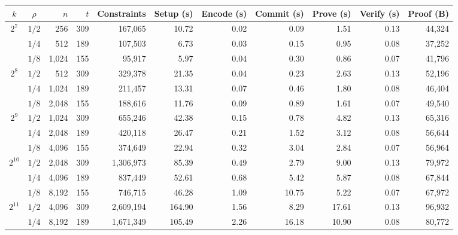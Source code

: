 \documentclass[conference,compsoc]{IEEEtran}
\newif\ifshowrevisions
\newenvironment{revblock}[1][]
  {%
    \ifshowrevisions
      \begin{tcolorbox}[
        breakable,
        colback=revisionyellow,
        colframe=revisionyellow,
        boxrule=0pt,
        arc=0pt,
        left=2pt,
        right=2pt,
        top=2pt,
        bottom=2pt,
        before skip=2pt,
        after skip=2pt,
        #1
      ]
    \fi
  }
  {%
    \ifshowrevisions
      \end{tcolorbox}
    \fi
  }
\theoremstyle{plain}
\theoremstyle{definition}
\theoremstyle{remark}
\providecommand{\DIFaddend}{} %
\begin{document}
\DIFaddend %
\begin{table}[!t]
\centering
\scriptsize
\setlength{\tabcolsep}{4pt}
\begin{revblock}[unbreakable]
\begin{tabular*}{\linewidth}{@{\extracolsep{\fill}}ccrrrrrrrrr@{}}
\toprule
\textbf{\(k\)} & \textbf{\(\rho\)} & \textbf{\(n\)} & \textbf{\(t\)}
& \textbf{Constraints} & \textbf{Setup (s)} & \textbf{Encode (s)}
& \textbf{Commit (s)} & \textbf{Prove (s)}
& \textbf{Verify (s)} & \textbf{Proof (B)} \\
\midrule
\multirow{3}{*}{\(2^7\)}
& \(1/2\) & 256 & 309 & 167{,}065 & 10.72 & 0.02 & 0.09 & 1.51 & 0.13 & 44{,}324 \\
& \(1/4\) & 512 & 189 & 107{,}503 & 6.73 & 0.03 & 0.15 & 0.95 & 0.08 & 37{,}252 \\
& \(1/8\) & 1{,}024 & 155 & 95{,}917 & 5.97 & 0.04 & 0.30 & 0.86 & 0.07 & 41{,}796 \\
\midrule
\multirow{3}{*}{\(2^8\)}
& \(1/2\) & 512 & 309 & 329{,}378 & 21.35 & 0.04 & 0.23 & 2.63 & 0.13 & 52{,}196 \\
& \(1/4\) & 1{,}024 & 189 & 211{,}457 & 13.31 & 0.07 & 0.46 & 1.80 & 0.08 & 46{,}404 \\
& \(1/8\) & 2{,}048 & 155 & 188{,}616 & 11.76 & 0.09 & 0.89 & 1.61 & 0.07 & 49{,}540 \\
\midrule
\multirow{3}{*}{\(2^9\)}
& \(1/2\) & 1{,}024 & 309 & 655{,}246 & 42.38 & 0.15 & 0.78 & 4.82 & 0.13 & 65{,}316 \\
& \(1/4\) & 2{,}048 & 189 & 420{,}118 & 26.47 & 0.21 & 1.52 & 3.12 & 0.08 & 56{,}644 \\
& \(1/8\) & 4{,}096 & 155 & 374{,}649 & 22.94 & 0.32 & 3.04 & 2.84 & 0.07 & 56{,}964 \\
\midrule
\multirow{3}{*}{\(2^{10}\)}
& \(1/2\) & 2{,}048 & 309 & 1{,}306{,}973 & 85.39 & 0.49 & 2.79 & 9.00 & 0.13 & 79{,}972 \\
& \(1/4\) & 4{,}096 & 189 & 837{,}449 & 52.61 & 0.68 & 5.42 & 5.87 & 0.08 & 67{,}844 \\
& \(1/8\) & 8{,}192 & 155 & 746{,}715 & 46.28 & 1.09 & 10.75 & 5.22 & 0.07 & 67{,}972 \\
\midrule
\multirow{3}{*}{\(2^{11}\)}
& \(1/2\) & 4{,}096 & 309 & 2{,}609{,}194 & 164.90 & 1.56 & 8.29 & 17.61 & 0.13 & 96{,}932 \\
& \(1/4\) & 8{,}192 & 189 & 1{,}671{,}349 & 105.49 & 2.26 & 16.18 & 10.90 & 0.08 & 80{,}772 \\

\end{tabular*}
\end{revblock}
\end{table}
\end{document}
